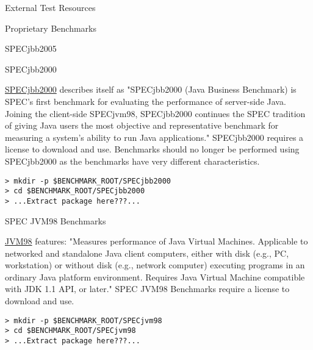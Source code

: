 \begin{section}{External Test Resources}
\begin{subsection}{Proprietary Benchmarks}
\begin{subsubsection}{SPECjbb2005}
\end{subsubsection}

\begin{subsubsection}{SPECjbb2000}

\href{http://www.spec.org/jbb2000/}{SPECjbb2000} describes itself as "SPECjbb2000 (Java Business Benchmark) is SPEC's first benchmark for evaluating the performance of server-side Java. Joining the client-side SPECjvm98, SPECjbb2000 continues the SPEC tradition of giving Java users the most objective and representative benchmark for measuring a system's ability to run Java applications." SPECjbb2000 requires a license to download and use. Benchmarks should no longer be performed using SPECjbb2000 as the benchmarks have very different characteristics.

\begin{lstlisting}
> mkdir -p $BENCHMARK_ROOT/SPECjbb2000
> cd $BENCHMARK_ROOT/SPECjbb2000
> ...Extract package here???...
\end{lstlisting}

\end{subsubsection}

\begin{subsubsection}{SPEC JVM98 Benchmarks}

\href{http://www.spec.org/jvm98/}{JVM98} features: "Measures performance of Java Virtual Machines. Applicable to networked and standalone Java client computers, either with disk (e.g., PC, workstation) or without disk (e.g., network computer) executing programs in an ordinary Java platform environment. Requires Java Virtual Machine compatible with JDK 1.1 API, or later." SPEC JVM98 Benchmarks require a license to download and use.

\begin{lstlisting}
> mkdir -p $BENCHMARK_ROOT/SPECjvm98
> cd $BENCHMARK_ROOT/SPECjvm98
> ...Extract package here???...
\end{lstlisting}

\end{subsubsection}

\end{subsection}

\end{section}
